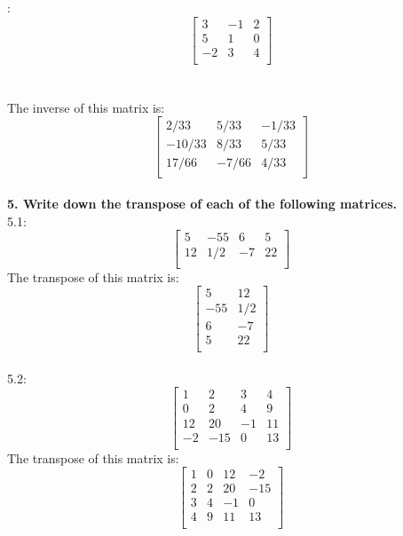 \documentclass[a4paper,12pt]{article} %
\begin{document}
: \\
\[
\begin{bmatrix}
    3 & -1 & 2 \\
    5 & 1 & 0 \\
    -2 & 3 & 4 \\
\end{bmatrix}
\] \\
\\
The inverse of this matrix is: \\
\[
\begin{bmatrix}
    2/33 & 5/33 & -1/33 \\
    -10/33 & 8/33 & 5/33 \\
    17/66 & -7/66 & 4/33 \\
\end{bmatrix}
\]
\\


\noindent
\textbf{5. Write down the transpose of each of the following matrices.} \\
5.1: \\
\[
\begin{bmatrix}
    5 & -55 & 6 & 5 \\
    12 & 1/2 & -7 & 22 \\
\end{bmatrix}
\]
The transpose of this matrix is: \\
\[
\begin{bmatrix}
    5 & 12 \\
    -55 & 1/2 \\
    6 & -7 \\
    5 & 22 \\
\end{bmatrix}
\]
\\
5.2: \\
\[
\begin{bmatrix}
    1 & 2 & 3 & 4 \\
    0 & 2 & 4 & 9 \\
    12 & 20 & -1 & 11 \\
    -2 & -15 & 0 & 13 \\
\end{bmatrix}
\]
The transpose of this matrix is: \\
\[
\begin{bmatrix}
    1 & 0 & 12 & -2 \\
    2 & 2 & 20 & -15 \\
    3 & 4 & -1 & 0 \\
    4 & 9 & 11 & 13 \\
\end{bmatrix}
\]
\\
\end{document}
